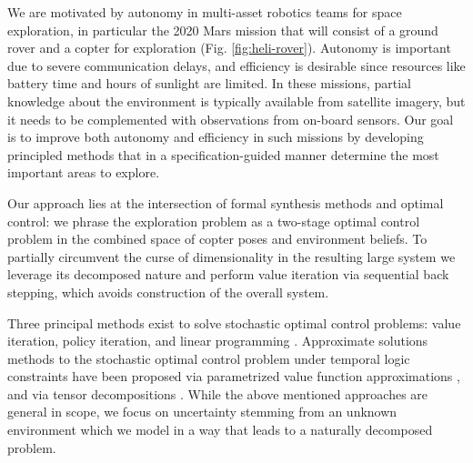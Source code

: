 \documentclass[draft,conference]{IEEEtran}
\begin{document}
We are motivated by autonomy  in multi-asset robotics teams for space exploration, in particular the 2020 Mars mission that will consist of a ground rover and a copter for exploration (Fig. \ref{fig:heli-rover}). Autonomy is important due to severe communication delays, and efficiency is desirable since resources like battery time and hours of sunlight are limited. In these missions, partial knowledge about the environment is typically available from satellite imagery, but it needs to be complemented with observations from on-board sensors. Our goal is to improve both autonomy and efficiency in such missions by developing principled methods that in a specification-guided manner determine the most important areas to explore. 

Our approach lies at the intersection of formal synthesis methods and optimal control: we phrase the exploration problem as a two-stage optimal control problem in the combined space of copter poses and environment beliefs.
To partially circumvent the curse of dimensionality in the resulting large system we leverage its decomposed nature and perform value iteration via sequential back stepping, which avoids construction of the overall system.


Three principal methods exist to solve stochastic optimal control problems: value iteration, policy iteration, and linear programming \cite{Bertsekas1978}. Approximate solutions methods to the stochastic optimal control problem under temporal logic constraints have been proposed via parametrized value function approximations \cite{Papusha2016,Leong2016}, and via tensor decompositions \cite{Alora2016}. While the above mentioned approaches are general in scope, we focus on uncertainty stemming from an unknown environment which we model in a way that leads to a naturally decomposed problem. 

\end{document}
